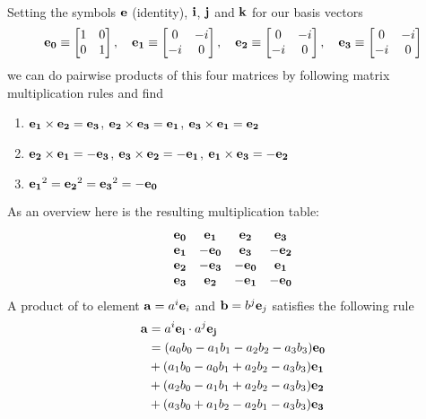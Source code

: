 \documentclass[11pt, oneside]{article}   	%
\begin{document}
\\
%
Setting the symbols $\mathbf{e}$ (identity), $\mathbf{i}$, $\mathbf{j}$ and $\mathbf{k}$ for our basis vectors
\begin{equation}
\mathbf{e_0} \equiv
\begin{bmatrix}
	1 & 0 \\
	0 & 1
\end{bmatrix}
,\quad
\mathbf{e_1} \equiv
\begin{bmatrix}
	0 & -i \\
	-i & 0
\end{bmatrix}
,\quad
\mathbf{e_2} \equiv
\begin{bmatrix}
	0 & -i \\
	-i & 0
\end{bmatrix}
,\quad
\mathbf{e_3} \equiv
\begin{bmatrix}
	0 & -i \\
	-i & 0
\end{bmatrix}
\end{equation}
%
we can do pairwise products of this four matrices by following matrix multiplication rules and find \\
\begin{enumerate}
  \item $\mathbf{e_1} \times \mathbf{e_2} = \mathbf{e_3}$, $\mathbf{e_2} \times \mathbf{e_3} = \mathbf{e_1}$, $\mathbf{e_3} \times \mathbf{e_1} = \mathbf{e_2}$
  \item $\mathbf{e_2} \times \mathbf{e_1} = -\mathbf{e_3}$, $\mathbf{e_3} \times \mathbf{e_2} = -\mathbf{e_1}$, $\mathbf{e_1} \times \mathbf{e_3} = -\mathbf{e_2}$
  \item $\mathbf{e_1}^2 = \mathbf{e_2}^2 = \mathbf{e_3}^2 = -\mathbf{e_0}$
\end{enumerate}
%
As an overview here is the resulting multiplication table:
\begin{equation}
\begin{matrix}
	\mathbf{e_0} &  \mathbf{e_1} &  \mathbf{e_2} &  \mathbf{e_3} \\
	\mathbf{e_1} & -\mathbf{e_0} &  \mathbf{e_3} & -\mathbf{e_2} \\
	\mathbf{e_2} & -\mathbf{e_3} & -\mathbf{e_0} &  \mathbf{e_1} \\
	\mathbf{e_3} &  \mathbf{e_2} & -\mathbf{e_1} & -\mathbf{e_0} \\
\end{matrix}
\end{equation}
%
A product of to element $\mathbf{a} = a^i \mathbf{e}_i$ and $\mathbf{b} = b^j \mathbf{e}_j$ satisfies the following rule
\begin{subequations}
\begin{align*}
	\mathbf{a} &= a^i \mathbf{e_i} \cdot a^j \mathbf{e_j} \\
	&= (a_0b_0 - a_1b_1 - a_2b_2 - a_3b_3) \mathbf{e_0} \\
	&+ (a_1b_0 - a_0b_1 + a_2b_2 - a_3b_3) \mathbf{e_1} \\
	&+ (a_2b_0 - a_1b_1 + a_2b_2 - a_3b_3) \mathbf{e_2} \\
	&+ (a_3b_0 + a_1b_2 - a_2b_1 - a_3b_3) \mathbf{e_3} 
\end{align*}
\end{subequations}
\end{document}
